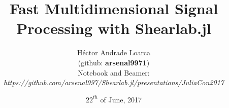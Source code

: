 \title[Fast Multidimensional Signal Processing with Shearlab.jl]{Fast Multidimensional Signal Processing with Shearlab.jl}
\author{H\'ector Andrade Loarca\\ (github: \textbf{arsenal9971})\\Notebook and Beamer:\\\textit{https://github.com/arsenal997/Shearlab.jl/presentations/JuliaCon2017}}
\date{$22^{th}$ of June, 2017}

\newcommand{\mylogo}{\texttt{[image: Images/bms-logo-button.png]}}

\begin{frame}[plain]
	\titlepage
\end{frame}

